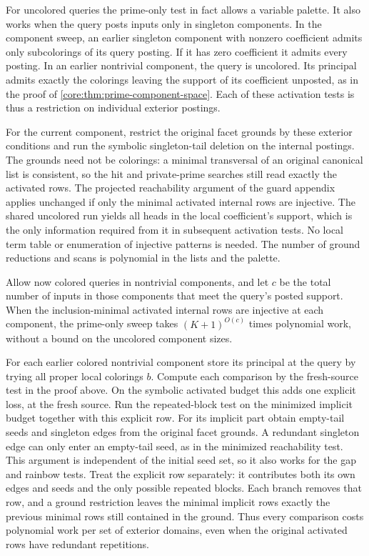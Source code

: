 For uncolored queries the prime-only test in fact
allows a variable palette. It also works when the
query posts inputs only in singleton components.
In the component sweep, an earlier singleton
component with nonzero coefficient admits only
subcolorings of its query posting. If it has zero
coefficient it admits every posting. In an earlier
nontrivial component, the query is uncolored.
Its principal admits exactly the colorings leaving
the support of its coefficient unposted, as in
the proof of \cref{core:thm:prime-component-space}.
Each of these activation tests is thus a restriction
on individual exterior postings.

For the current component, restrict the original
facet grounds by these exterior conditions and
run the symbolic singleton-tail deletion on the
internal postings. The grounds need not be
colorings: a minimal transversal of an original
canonical list is consistent, so the hit and
private-prime searches still read exactly the
activated rows. The projected reachability
argument of the guard appendix applies unchanged
if only the minimal activated internal rows are
injective. The shared uncolored run yields all
heads in the local coefficient's support, which
is the only information required from it in
subsequent activation tests. No local term table
or enumeration of injective patterns is needed.
The number of ground reductions and scans is
polynomial in the lists and the palette.

Allow now colored queries in nontrivial components,
and let $c$ be the total number of inputs in those
components that meet the query's posted support.
When the inclusion-minimal activated internal
rows are injective at each component, the prime-only sweep takes
$(K+1)^{O(c)}$ times polynomial work, without a
bound on the uncolored component sizes.

For each earlier colored nontrivial component store
its principal at the query by trying all proper
local colorings $b$. Compute each comparison by the
fresh-source test in the proof above. On the
symbolic activated budget this adds one explicit
loss, at the fresh source. Run the repeated-block
test on the minimized implicit budget together
with this explicit row. For its implicit part obtain
empty-tail seeds and singleton edges from the original
facet grounds. A redundant singleton edge can only
enter an empty-tail seed, as in the minimized
reachability test. This argument is independent of
the initial seed set, so it also works for the gap
and rainbow tests. Treat the explicit row separately:
it contributes both its own edges and seeds and
the only possible repeated blocks. Each branch
removes that row, and a ground restriction leaves
the minimal implicit rows exactly the previous
minimal rows still contained in the ground.
Thus every comparison costs polynomial work per
set of exterior domains, even when the original
activated rows have redundant repetitions.

